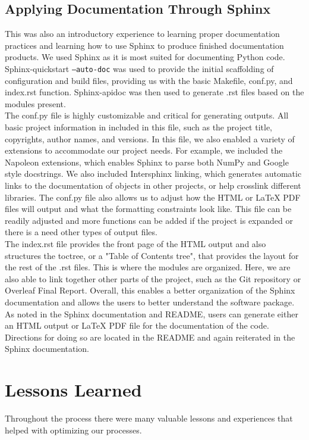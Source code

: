 \documentclass[10pt,letterpaper]{article}
\begin{document}
\subsection{Applying Documentation Through Sphinx}
This was also an introductory experience to learning proper documentation practices and learning how to use Sphinx to produce finished documentation products. We used Sphinx as it is most suited for documenting Python code. Sphinx-quickstart \texttt{--auto-doc} was used to provide the initial scaffolding of configuration and build files, providing us with the basic Makefile, conf.py, and index.rst function. Sphinx-apidoc was then used to generate .rst files based on the modules present.\\

\noindent The conf.py file is highly customizable and critical for generating outputs. All basic project information in included in this file, such as the project title, copyrights, author names, and versions. In this file, we also enabled a variety of extensions to accommodate our project needs. For example, we included the Napoleon extensions, which enables Sphinx to parse both NumPy and Google style docstrings. We also included Intersphinx linking, which generates automatic links to the documentation of objects in other projects, or help crosslink different libraries. The conf.py file also allows us to adjust how the HTML or LaTeX PDF files will output and what the formatting constraints look like. This file can be readily adjusted and more functions can be added if the project is expanded or there is a need other types of output files.\\

\noindent The index.rst file provides the front page of the HTML output and also structures the toctree, or a "Table of Contents tree", that provides the layout for the rest of the .rst files. This is where the modules are organized. Here, we are also able to link together other parts of the project, such as the Git repository or Overleaf Final Report. Overall, this enables a better organization of the Sphinx documentation and allows the users to better understand the software package.\\ 

\noindent As noted in the Sphinx documentation and README, users can generate either an HTML output or LaTeX PDF file for the documentation of the code. Directions for doing so are located in the README and again reiterated in the Sphinx documentation. 

\section{Lessons Learned}
Throughout the process there were many valuable lessons and experiences that helped with optimizing our processes. 
\end{document}
